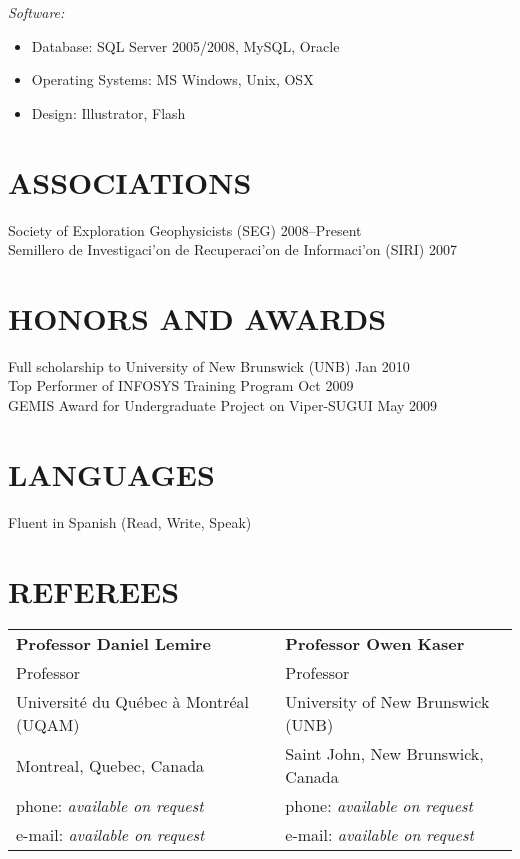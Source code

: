 \documentclass[line,margin]{res}
\begin{document}
\begin{resume}
    {\sl Software:}
    \begin{itemize} \itemsep -2pt
        \item Database: SQL Server 2005/2008, MySQL, Oracle
        \item Operating Systems: MS Windows, Unix, OSX
        \item Design: Illustrator, Flash
    \end{itemize} 

\section{ ASSOCIATIONS} %
\label{sec:associations}
    Society of Exploration Geophysicists (SEG) \hfill 2008--Present\\
    Semillero de Investigaci\a'on de Recuperaci\a'on de Informaci\a'on (SIRI) \hfill 2007\\

\section{ HONORS AND AWARDS} %
\label{sec:honors_and_awards}
    Full scholarship to University of New Brunswick (UNB) \hfill Jan 2010\\
    Top Performer of INFOSYS Training Program \hfill Oct 2009\\
    GEMIS Award for Undergraduate Project on Viper-SUGUI \hfill May 2009\\

\section{ LANGUAGES} %
\label{sec:languages}
    Fluent in Spanish (Read, Write, Speak)


\section{REFEREES} %
\label{sec:referees}

\begin{tabular}{@{}p{6cm}p{6cm}}
\textbf{Professor Daniel Lemire}        &  \textbf{Professor Owen Kaser}            \\
Professor                               &  Professor                                \\
Université du Québec à Montréal (UQAM)  &  University of New Brunswick (UNB)        \\
Montreal, Quebec, Canada                &  Saint John, New Brunswick, Canada        \\
phone: \textsl{available on request}    &  phone: \textsl{available on request}     \\
e-mail: \textsl{available on request}   &  e-mail: \textsl{available on request}    \\
\end{tabular}


\end{resume}
\end{document}
